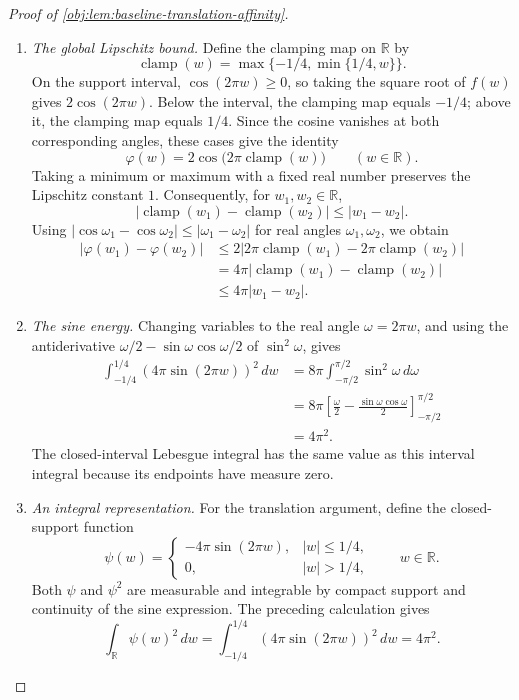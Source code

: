 \begin{proof}[Proof of \cref{obj:lem:baseline-translation-affinity}]
\begin{enumerate}
\item \emph{The global Lipschitz bound.}
Define the clamping map on \(\mathbb R\) by
\[
\operatorname{clamp}(w)
=\max\{-1/4,\min\{1/4,w\}\}.
\]
On the support interval, \(\cos(2\pi w)\ge0\), so taking the square root of \(f(w)\) gives \(2\cos(2\pi w)\). Below the interval, the clamping map equals \(-1/4\); above it, the clamping map equals \(1/4\). Since the cosine vanishes at both corresponding angles, these cases give the identity
\[
\varphi(w)=2\cos\bigl(2\pi\operatorname{clamp}(w)\bigr)
\qquad(w\in\mathbb R).
\]
Taking a minimum or maximum with a fixed real number preserves the Lipschitz constant \(1\). Consequently, for \(w_1,w_2\in\mathbb R\),
\[
\bigl|\operatorname{clamp}(w_1)-\operatorname{clamp}(w_2)\bigr|
\le |w_1-w_2|.
\]
Using \(|\cos \omega_1-\cos \omega_2|\le|\omega_1-\omega_2|\) for real angles \(\omega_1,\omega_2\), we obtain
\[
\begin{aligned}
|\varphi(w_1)-\varphi(w_2)|
&\le 2\bigl|2\pi\operatorname{clamp}(w_1)
             -2\pi\operatorname{clamp}(w_2)\bigr|\\
&=4\pi\bigl|\operatorname{clamp}(w_1)
             -\operatorname{clamp}(w_2)\bigr|\\
&\le4\pi|w_1-w_2|.
\end{aligned}
\]

\item \emph{The sine energy.}
Changing variables to the real angle \(\omega=2\pi w\), and using the antiderivative
\(\omega/2-\sin\omega\cos\omega/2\) of \(\sin^2\omega\), gives
\[
\begin{aligned}
\int_{-1/4}^{1/4}(4\pi\sin(2\pi w))^2\,dw
&=8\pi\int_{-\pi/2}^{\pi/2}\sin^2\omega\,d\omega\\
&=8\pi
  \left[\frac{\omega}{2}
        -\frac{\sin\omega\cos\omega}{2}\right]_{-\pi/2}^{\pi/2}\\
&=4\pi^2.
\end{aligned}
\]
The closed-interval Lebesgue integral has the same value as this interval integral because its endpoints have measure zero.

\item \emph{An integral representation.}
For the translation argument, define the closed-support function
\[
\psi(w)=
\begin{cases}
-4\pi\sin(2\pi w),& |w|\le1/4,\\
0,& |w|>1/4,
\end{cases}
\qquad w\in\mathbb R.
\]
Both \(\psi\) and \(\psi^2\) are measurable and integrable by compact support and continuity of the sine expression. The preceding calculation gives
\[
\int_{\mathbb R}\psi(w)^2\,dw
=\int_{-1/4}^{1/4}(4\pi\sin(2\pi w))^2\,dw
=4\pi^2.
\]


\end{enumerate}
\end{proof}
